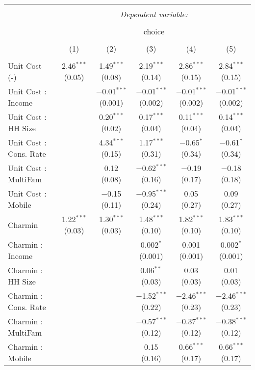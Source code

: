 
\begin{table}[!htbp] \centering 
  \caption{} 
  \label{tab:mnlCharlotteObsHet} 
\begin{tabular}{@{\extracolsep{5pt}}lccccc} 
\\[-1.8ex]\hline 
\hline \\[-1.8ex] 
 & \multicolumn{5}{c}{\textit{Dependent variable:}} \\ 
\cline{2-6} 
\\[-1.8ex] & \multicolumn{5}{c}{choice} \\ 
\\[-1.8ex] & (1) & (2) & (3) & (4) & (5)\\ 
\hline \\[-1.8ex] 
 Unit Cost (-) & 2.46$^{***}$ (0.05) & 1.49$^{***}$ (0.08) & 2.19$^{***}$ (0.14) & 2.86$^{***}$ (0.15) & 2.84$^{***}$ (0.15) \\ 
  Unit Cost : Income &  & $-$0.01$^{***}$ (0.001) & $-$0.01$^{***}$ (0.002) & $-$0.01$^{***}$ (0.002) & $-$0.01$^{***}$ (0.002) \\ 
  Unit Cost : HH Size &  & 0.20$^{***}$ (0.02) & 0.17$^{***}$ (0.04) & 0.11$^{***}$ (0.04) & 0.14$^{***}$ (0.04) \\ 
  Unit Cost : Cons. Rate &  & 4.34$^{***}$ (0.15) & 1.17$^{***}$ (0.31) & $-$0.65$^{*}$ (0.34) & $-$0.61$^{*}$ (0.34) \\ 
  Unit Cost : MultiFam &  & 0.12 (0.08) & $-$0.62$^{***}$ (0.16) & $-$0.19 (0.17) & $-$0.18 (0.18) \\ 
  Unit Cost : Mobile &  & $-$0.15 (0.11) & $-$0.95$^{***}$ (0.24) & 0.05 (0.27) & 0.09 (0.27) \\ 
  Charmin & 1.22$^{***}$ (0.03) & 1.30$^{***}$ (0.03) & 1.48$^{***}$ (0.10) & 1.82$^{***}$ (0.10) & 1.83$^{***}$ (0.10) \\ 
  Charmin : Income &  &  & 0.002$^{*}$ (0.001) & 0.001 (0.001) & 0.002$^{*}$ (0.001) \\ 
  Charmin : HH Size &  &  & 0.06$^{**}$ (0.03) & 0.03 (0.03) & 0.01 (0.03) \\ 
  Charmin : Cons. Rate &  &  & $-$1.52$^{***}$ (0.22) & $-$2.46$^{***}$ (0.23) & $-$2.46$^{***}$ (0.23) \\ 
  Charmin : MultiFam &  &  & $-$0.57$^{***}$ (0.12) & $-$0.37$^{***}$ (0.12) & $-$0.38$^{***}$ (0.12) \\ 
  Charmin : Mobile &  &  & 0.15 (0.16) & 0.66$^{***}$ (0.17) & 0.66$^{***}$ (0.17) \\ 

\end{tabular}
\end{table}
